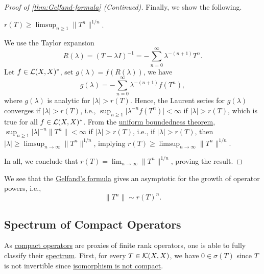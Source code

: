 \begin{proof}[Proof of \autoref{thm:Gelfand-formula} (Continued)]
	Finally, we show the following.
	\begin{claim}
		\(r(T) \geq \limsup_{n \geq 1} \lVert T^n \rVert ^{1 / n} \).
	\end{claim}
	\begin{explanation}
		We use the Taylor expansion
		\[
			R(\lambda ) = (T - \lambda I)^{-1} = - \sum_{n=0}^{\infty} \lambda ^{-(n+1)}T^n.
		\]
		Let \(f\in \mathcal{\MakeUppercase{l}} (X, X)^{\ast} \), set \(g(\lambda ) = f(R(\lambda ))\), we have
		\[
			g(\lambda ) = - \sum_{n=0}^{\infty} \lambda ^{-(n+1)} f(T^n),
		\]
		where \(g(\lambda )\) is analytic for \(\vert \lambda  \vert > r(T)\). Hence, the Laurent series for \(g(\lambda )\) converges if \(\vert \lambda  \vert > r(T)\), i.e., \(\sup _{n\geq 1} \vert \lambda ^{-n} f(T^n) \vert < \infty\) if \(\vert \lambda  \vert > r(T)\), which is true for all \(f\in \mathcal{\MakeUppercase{l}} (X, X)^{\ast} \). From the \hyperref[thm:uniform-boundedness]{uniform boundedness theorem}, \(\sup _{n\geq 1} \vert \lambda  \vert^{-n} \lVert T^n \rVert < \infty\) if \(\vert \lambda  \vert > r(T) \), i.e., if \(\vert \lambda  \vert > r(T) \), then \(\vert \lambda \vert \geq \limsup_{n \to \infty} \lVert T^n \rVert ^{1 / n}\), implying \(r(T) \geq \limsup_{n \to \infty} \lVert T^n \rVert ^{1 / n}\).
	\end{explanation}

	In all, we conclude that \(r(T) = \lim_{n \to \infty} \lVert T^n \rVert ^{1 / n}\), proving the result.
\end{proof}

\begin{remark}
	We see that the \hyperref[thm:Gelfand-formula]{Gelfand's formula} gives an asymptotic for the growth of operator powers, i.e.,
	\[
		\lVert T^n \rVert \sim r(T)^n.
	\]
\end{remark}

\subsection{Spectrum of Compact Operators}
As \hyperref[def:compact-op]{compact operators} are proxies of finite rank operators, one is able to fully classify their \hyperref[def:spectrum-point]{spectrum}. First, for every \(T\in \mathcal{\MakeUppercase{k}} (X, X)\), we have \(0\in \sigma (T)\) since \(T\) is not invertible since \hyperref[col:iso-are-not-compact]{isomorphism is not compact}.

